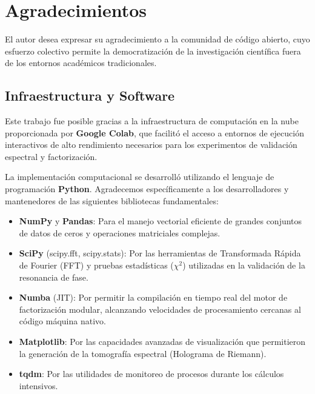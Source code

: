 \documentclass[12pt, a4paper]{article}
\theoremstyle{plain}
\theoremstyle{definition}
\begin{document}
\section*{Agradecimientos}

El autor desea expresar su agradecimiento a la comunidad de código abierto, cuyo esfuerzo colectivo permite la democratización de la investigación científica fuera de los entornos académicos tradicionales.

\subsection*{Infraestructura y Software}

Este trabajo fue posible gracias a la infraestructura de computación en la nube proporcionada por \textbf{Google Colab}, que facilitó el acceso a entornos de ejecución interactivos de alto rendimiento necesarios para los experimentos de validación espectral y factorización.

La implementación computacional se desarrolló utilizando el lenguaje de programación \textbf{Python}. Agradecemos específicamente a los desarrolladores y mantenedores de las siguientes bibliotecas fundamentales:

\begin{itemize}
    \item \textbf{NumPy} y \textbf{Pandas}: Para el manejo vectorial eficiente de grandes conjuntos de datos de ceros y operaciones matriciales complejas.
    \item \textbf{SciPy} (scipy.fft, scipy.stats): Por las herramientas de Transformada Rápida de Fourier (FFT) y pruebas estadísticas ($\chi^2$) utilizadas en la validación de la resonancia de fase.
    \item \textbf{Numba} (JIT): Por permitir la compilación en tiempo real del motor de factorización modular, alcanzando velocidades de procesamiento cercanas al código máquina nativo.
    \item \textbf{Matplotlib}: Por las capacidades avanzadas de visualización que permitieron la generación de la tomografía espectral (Holograma de Riemann).
    \item \textbf{tqdm}: Por las utilidades de monitoreo de procesos durante los cálculos intensivos.
\end{itemize}
\end{document}
